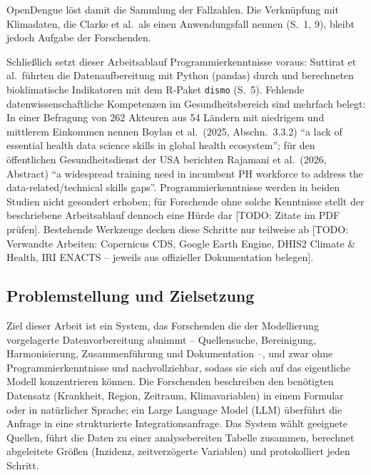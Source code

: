 \documentclass[11pt,a4paper]{article}
\newcommand{\todo}[1]{\textcolor{red!70!black}{[TODO: #1]}}
\begin{document}
OpenDengue löst damit die Sammlung der Fallzahlen. Die Verknüpfung mit
Klimadaten, die Clarke et al.\ als einen Anwendungsfall nennen (S.~1, 9),
bleibt jedoch Aufgabe der Forschenden.

Schließlich setzt dieser Arbeitsablauf Programmierkenntnisse voraus: Suttirat
et al.\ führten die Datenaufbereitung mit Python (pandas) durch und berechneten
bioklimatische Indikatoren mit dem R-Paket \texttt{dismo} (S.~5). Fehlende
datenwissenschaftliche Kompetenzen im Gesundheitsbereich sind mehrfach belegt: In
einer Befragung von 262 Akteuren aus 54 Ländern mit niedrigem und mittlerem
Einkommen nennen Boylan et al.\ (2025, Abschn.~3.3.2) \enquote{a lack of essential
health data science skills in global health ecosystem}; für den öffentlichen
Gesundheitsdienst der USA berichten Rajamani et al.\ (2026, Abstract) \enquote{a
widespread training need in incumbent PH workforce to address the
data-related/technical skills gaps}. Programmierkenntnisse werden in beiden
Studien nicht gesondert erhoben; für Forschende ohne solche Kenntnisse stellt der
beschriebene Arbeitsablauf dennoch eine Hürde dar \todo{Zitate im PDF prüfen}.
Bestehende Werkzeuge decken diese Schritte nur teilweise ab
\todo{Verwandte Arbeiten: Copernicus CDS, Google Earth Engine, DHIS2 Climate \& Health, IRI ENACTS -- jeweils aus offizieller Dokumentation belegen}.

\subsection{Problemstellung und Zielsetzung}

Ziel dieser Arbeit ist ein System, das Forschenden die der Modellierung
vorgelagerte Datenvorbereitung abnimmt -- Quellensuche, Bereinigung,
Harmonisierung, Zusammenführung und Dokumentation --, und zwar ohne
Programmierkenntnisse und nachvollziehbar, sodass sie sich auf das eigentliche
Modell konzentrieren können. Die Forschenden beschreiben den benötigten
Datensatz (Krankheit, Region, Zeitraum, Klimavariablen) in einem Formular oder
in natürlicher Sprache; ein Large Language Model (LLM) überführt die Anfrage in
eine strukturierte Integrationsanfrage. Das System wählt geeignete Quellen,
führt die Daten zu einer analysebereiten Tabelle zusammen, berechnet abgeleitete
Größen (Inzidenz, zeitverzögerte Variablen) und protokolliert jeden Schritt.
\end{document}
